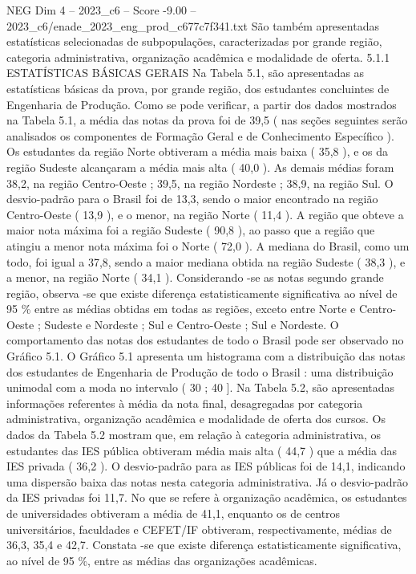 \begin{textsample}{NEG Dim 4 – 2023\_c6 – Score -9.00 – 2023\_c6/enade\_2023\_eng\_prod\_c677c7f341.txt}
São também apresentadas estatísticas selecionadas de subpopulações, caracterizadas por grande região, categoria administrativa, organização acadêmica e modalidade de oferta. 5.1.1 ESTATÍSTICAS BÁSICAS GERAIS Na Tabela 5.1, são apresentadas as estatísticas básicas da prova, por grande região, dos estudantes concluintes de Engenharia de Produção.
Como se pode verificar, a partir dos dados mostrados na Tabela 5.1, a média das notas da prova foi de 39,5 ( nas seções seguintes serão analisados os componentes de Formação Geral e de Conhecimento Específico ).
Os estudantes da região Norte obtiveram a média mais baixa ( 35,8 ), e os da região Sudeste alcançaram a média mais alta ( 40,0 ).
As demais médias foram 38,2, na região Centro-Oeste ; 39,5, na região Nordeste ; 38,9, na região Sul.
O desvio-padrão para o Brasil foi de 13,3, sendo o maior encontrado na região Centro-Oeste ( 13,9 ), e o menor, na região Norte ( 11,4 ).
A região que obteve a maior nota máxima foi a região Sudeste ( 90,8 ), ao passo que a região que atingiu a menor nota máxima foi o Norte ( 72,0 ).
A mediana do Brasil, como um todo, foi igual a 37,8, sendo a maior mediana obtida na região Sudeste ( 38,3 ), e a menor, na região Norte ( 34,1 ).
Considerando -se as notas segundo grande região, observa -se que existe diferença estatisticamente significativa ao nível de 95 \% entre as médias obtidas em todas as regiões, exceto entre Norte e Centro-Oeste ; Sudeste e Nordeste ; Sul e Centro-Oeste ; Sul e Nordeste.
O comportamento das notas dos estudantes de todo o Brasil pode ser observado no Gráfico 5.1.
O Gráfico 5.1 apresenta um histograma com a distribuição das notas dos estudantes de Engenharia de Produção de todo o Brasil : uma distribuição unimodal com a moda no intervalo ( 30 ; 40 ].
Na Tabela 5.2, são apresentadas informações referentes à média da nota final, desagregadas por categoria administrativa, organização acadêmica e modalidade de oferta dos cursos.
Os dados da Tabela 5.2 mostram que, em relação à categoria administrativa, os estudantes das IES pública obtiveram média mais alta ( 44,7 ) que a média das IES privada ( 36,2 ).
O desvio-padrão para as IES públicas foi de 14,1, indicando uma dispersão baixa das notas nesta categoria administrativa.
Já o desvio-padrão da IES privadas foi 11,7.
No que se refere à organização acadêmica, os estudantes de universidades obtiveram a média de 41,1, enquanto os de centros universitários, faculdades e CEFET/IF obtiveram, respectivamente, médias de 36,3, 35,4 e 42,7.
Constata -se que existe diferença estatisticamente significativa, ao nível de 95 \%, entre as médias das organizações acadêmicas.

\end{textsample}
